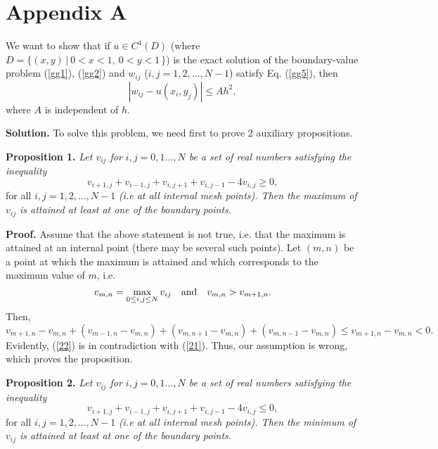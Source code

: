 

\setcounter{equation}{0}
\renewcommand{\theequation}{A.\arabic{equation}}

\section{Appendix A}

 
We want to show that if $u\in C^{4}(D)$ (where $D=\{(x,y)\, \vert \ 0<x<1, \ 0<y<1 \, \}$)
is the exact solution of the boundary-value
problem (\ref{gg1}), (\ref{gg2}) and $w_{ij}$ ($i,j=1,2, \dots,N-1$) satisfy Eq. (\ref{gg5}), then
\[
\left\vert w_{ij}-u(x_{i}, y_{j})\right\vert \leq Ah^{2},
\]
where $A$ is independent of $h$.

\vskip 0.3cm
 
{\bf Solution.} To solve this problem, we need first to prove 2 auxiliary propositions.

\vskip 0.3cm
 
{\bf Proposition 1.} {\it Let $v_{ij}$ for $i,j=0,1\dots, N$ be a set of real numbers satisfying
the inequality}
\begin{equation}
v_{i+1,j}+v_{i-1,j}+v_{i,j+1}+v_{i,j-1}-4v_{i,j}\geq 0, \label{21}
\end{equation}
for all
$i,j=1,2,\dots,N-1$ {\it (i.e at all internal mesh points). Then
the maximum of $v_{ij}$ is attained at least at one of the boundary points.}

 
 
{\bf Proof.} Assume that the above statement is not true, i.e. that the maximum is attained at
an internal point (there may be several such points). Let $(m,n)$ be a point at which the maximum is attained and
which corresponds to the maximum value of $m$, i.e.
\[
v_{m,n}=\max_{0\leq i,j\leq N}v_{ij} \quad \hbox{and} \quad
v_{m,n}>v_{m+1,n}.
\]
Then,
\begin{equation}
v_{m+1,n}-v_{m,n}+(v_{m-1,n}-v_{m,n})+(v_{m,n+1}-v_{m,n})
+(v_{m,n-1}-v_{m,n})\leq v_{m+1,n}-v_{m,n}<0. \label{22}
\end{equation}
Evidently, (\ref{22}) is in contradiction with (\ref{21}). Thus, our assumption is wrong, which proves
the proposition.

 
 
{\bf Proposition 2.} {\it Let $v_{ij}$ for $i,j=0,1\dots, N$ be a set of real numbers satisfying
the inequality}
\begin{equation}
v_{i+1,j}+v_{i-1,j}+v_{i,j+1}+v_{i,j-1}-4v_{i,j}\leq 0, \label{23}
\end{equation}
for all
$i,j=1,2,\dots,N-1$ {\it (i.e at all internal mesh points). Then
the minimum of $v_{ij}$ is attained at least at one of the boundary points.}

